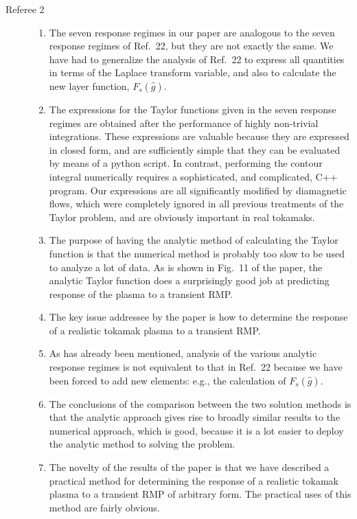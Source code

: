 \documentclass{article}[12pt]
\begin{document}
\begin{description}
\item[Referee 2]
\begin{enumerate}

\item The seven response regimes in our paper are analogous to the seven response regimes of Ref.~22, but they are not exactly the same. 
We have had to generalize the analysis of Ref.~22 to express all quantities in terms of the Laplace transform variable, and also to calculate
the new layer function, $F_s(\hat{g})$.

\item The expressions for the Taylor functions given in the seven response regimes are obtained after the performance of highly non-trivial integrations. 
These expressions are valuable because they are expressed in closed form, and are sufficiently simple that they can be evaluated by means of a python
script. In contrast, performing the contour integral numerically requires a sophisticated, and complicated, C++ program. Our expressions are all
significantly modified by diamagnetic flows, which were completely ignored in all previous treatments of the Taylor problem, and are obviously important
in real tokamaks.

\item The purpose of having the analytic method of calculating the Taylor function is that the numerical method is probably too slow to be
used to analyze a lot of data. As is shown in Fig.~11 of the paper, the analytic Taylor function does a surprisingly good job at predicting response 
of the plasma to a transient RMP.

\item The key issue addressee by the paper is how to determine the response of a realistic tokamak plasma to a transient RMP.

\item As has already been mentioned, analysis of the various analytic response regimes is not equivalent to that in Ref.~22 because
we have been forced to add new elements: e.g., the calculation of $F_s(\hat{g})$. 

\item The conclusions of the comparison between the two solution methods  is that the analytic approach gives rise to broadly similar results to the numerical approach, which is
good, because it is a lot easier to deploy the analytic method to solving the problem. 

\item The novelty of the results of the paper is that we have described a practical method for determining the response of a realistic tokamak plasma
to a transient RMP of arbitrary form. The practical uses of this method are fairly obvious.


\end{enumerate}
\end{description}
\end{document}
